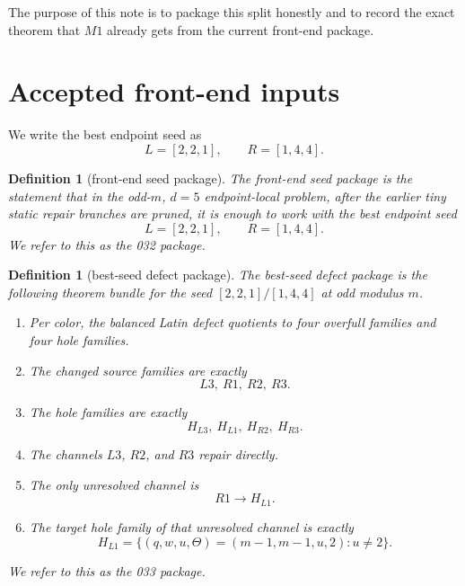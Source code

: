 \documentclass[11pt]{article}
\newtheorem{definition}[theorem]{Definition}
\newcommand{\HLone}{H_{L1}}
\begin{document}
The purpose of this note is to package this split honestly and to record the
exact theorem that $M1$ already gets from the current front-end package.

\section{Accepted front-end inputs}

We write the best endpoint seed as
\[
L=[2,2,1], \qquad R=[1,4,4].
\]

\begin{definition}[front-end seed package]
\label{def:F032}
The \emph{front-end seed package} is the statement that in the odd-$m$, $d=5$
endpoint-local problem, after the earlier tiny static repair branches are
pruned, it is enough to work with the best endpoint seed
\[
L=[2,2,1], \qquad R=[1,4,4].
\]
We refer to this as the \emph{032 package}.
\end{definition}

\begin{definition}[best-seed defect package]
\label{def:F033}
The \emph{best-seed defect package} is the following theorem bundle for the
seed $[2,2,1]/[1,4,4]$ at odd modulus $m$.
\begin{enumerate}[label=\textup{(\alph*)},leftmargin=2.5em]
\item Per color, the balanced Latin defect quotients to four overfull families
      and four hole families.
\item The changed source families are exactly
      \[
      L3,\ R1,\ R2,\ R3.
      \]
\item The hole families are exactly
      \[
      H_{L3},\ \HLone,\ H_{R2},\ H_{R3}.
      \]
\item The channels $L3$, $R2$, and $R3$ repair directly.
\item The only unresolved channel is
      \[
      R1 \to \HLone.
      \]
\item The target hole family of that unresolved channel is exactly
      \[
      \HLone
      =\{(q,w,u,\Theta)=(m-1,m-1,u,2): u\neq 2\}.
      \]
\end{enumerate}
We refer to this as the \emph{033 package}.
\end{definition}
\end{document}
